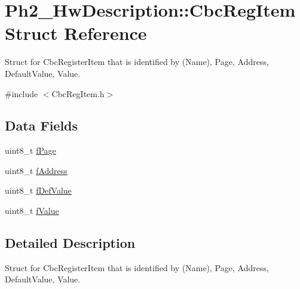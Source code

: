 \hypertarget{struct_ph2___hw_description_1_1_cbc_reg_item}{\section{Ph2\-\_\-\-Hw\-Description\-:\-:Cbc\-Reg\-Item Struct Reference}
\label{struct_ph2___hw_description_1_1_cbc_reg_item}
}


Struct for Cbc\-Register\-Item that is identified by (Name), Page, Address, Default\-Value, Value.  




{\ttfamily \#include $<$Cbc\-Reg\-Item.\-h$>$}

\subsection*{Data Fields}
\begin{DoxyCompactItemize}
\item 
uint8\-\_\-t \hyperlink{struct_ph2___hw_description_1_1_cbc_reg_item_a082fb29397d4a4e2ccbf4563c1385e6e}{f\-Page}
\item 
uint8\-\_\-t \hyperlink{struct_ph2___hw_description_1_1_cbc_reg_item_a67f6d52003832c42c7747f304d50a87d}{f\-Address}
\item 
uint8\-\_\-t \hyperlink{struct_ph2___hw_description_1_1_cbc_reg_item_a7c958bb4e0cd79891f3d3a191ef2f749}{f\-Def\-Value}
\item 
uint8\-\_\-t \hyperlink{struct_ph2___hw_description_1_1_cbc_reg_item_a1fa052a53215cbee674174febcc52b6a}{f\-Value}
\end{DoxyCompactItemize}


\subsection{Detailed Description}
Struct for Cbc\-Register\-Item that is identified by (Name), Page, Address, Default\-Value, Value. 

